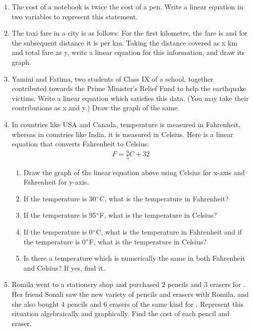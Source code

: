\renewcommand{\theequation}{\theenumi}
\begin{enumerate}[label=\arabic*.,ref=\thesubsection.\theenumi]
\item The cost of a notebook is twice the cost of a pen. Write a linear equation in two variables to represent this statement.
%
\item  The taxi fare in a city is as follows: For the first kilometre, the fare is  and for the subsequent distance it is  per km. Taking the distance covered as x km and total fare as \rupee y, write a linear equation for this information, and draw its graph.%
%
\item Yamini and Fatima, two students of Class IX of a school, together contributed  towards the Prime Minister’s Relief Fund to help the earthquake victims. Write a linear equation which satisfies this data. (You may take their contributions as \rupee x and \rupee y.) Draw the graph of the same.
\item In countries like USA and Canada, temperature is measured in Fahrenheit, whereas in countries like India, it is measured in Celsius. Here is a linear equation that converts Fahrenheit to Celsius:
%
\begin{align}
F =\frac{9}{ 5}C + 32
\end{align}
\begin{enumerate}
\item  Draw the graph of the linear equation above using Celsius for x-axis and Fahrenheit for y-axis.
\item If the temperature is 30$\degree$C, what is the temperature in Fahrenheit? 
\item If the temperature is 95$\degree$F, what is the temperature in Celsius? 
\item If the temperature is 0$\degree$C, what is the temperature in Fahrenheit and if the temperature is 0$\degree$F, what is the temperature in Celsius?
\item Is there a temperature which is numerically the same in both Fahrenheit and Celsius? If yes, find it.
\end{enumerate}
\item Romila went to a stationery shop and purchased 2 pencils and 3 erasers for . Her friend Sonali saw the new variety of pencils and erasers with Romila, and she also bought 4 pencils and 6 erasers of the same kind for . Represent this situation algebraically and graphically. Find the cost of each pencil and eraser.

\end{enumerate}
